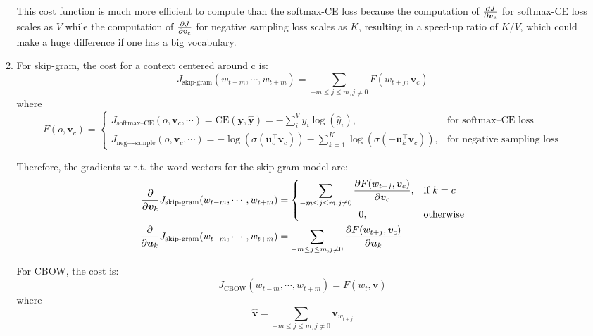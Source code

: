 \documentclass[10pt,reqno]{amsart}
\begin{document}
\begin{enumerate}[topsep=0pt,itemsep=3ex,partopsep=1ex,parsep=1ex]
\begin{enumerate}[itemsep=2ex]
    This cost function is much more efficient to compute than the softmax-CE loss 
    because the computation of $\frac{\partial J}{\partial \bm{v}_c}$ for softmax-CE loss scales as $V$
    while the computation of $\frac{\partial J}{\partial \bm{v}_c}$ for negative sampling loss scales as $K$, 
    resulting in a speed-up ratio of $K/V$,
    which could make a huge difference if one has a big vocabulary.

  \item
    For skip-gram, the cost for a context centered around c is:
    \begin{equation*}
      J_\text{skip-gram}(w_{t-m},\cdots,w_{t+m})
      = \sum_{-m \leq j \leq m, j \neq 0} F(w_{t+j}, \bm{v}_c)
    \end{equation*}
    where
    \begin{equation*}
      F(o, \bm{v}_c) = 
      \begin{cases}
        J_\text{softmax--CE}(o, \bm{v}_c, \cdots) = \text{CE}(\bm{y}, \bm{\hat{y}}) = - \displaystyle\sum_i^V y_i \log(\hat{y}_i), & \text{for softmax--CE loss} \\
        J_\text{neg−-sample}(o, \bm{v}_c, \cdots) = -\log(\sigma(\bm{u}_o^\top \bm{v}_c)) - \displaystyle\sum_{k=1}^K \log(\sigma(-\bm{u}_k^\top \bm{v}_c)), & \text{for negative sampling loss}
      \end{cases}
    \end{equation*}

    Therefore, the gradients w.r.t. the word vectors for the skip-gram model are:
    \begin{align*}
      \frac{\partial}{\partial \bm{v}_k} J_\text{skip-gram}(w_{t-m},\cdots,w_{t+m}) &= 
      \begin{cases}
        \displaystyle\sum_{-m \leq j \leq m, j \neq 0} \frac{\partial F(w_{t+j}, \bm{v}_c)}{\partial \bm{v}_c}, & \text{if}\ k = c \\
        \qquad\qquad\qquad 0, & \text{otherwise}
      \end{cases}\\
      \frac{\partial}{\partial \bm{u}_k} J_\text{skip-gram}(w_{t-m},\cdots,w_{t+m}) 
      &= \sum_{-m \leq j \leq m, j \neq 0} \frac{\partial F(w_{t+j}, \bm{v}_c)}{\partial \bm{u}_k} 
    \end{align*}

    For CBOW, the cost is:
    \begin{equation*}
      J_\text{CBOW}(w_{t-m},\cdots,w_{t+m}) = F(w_t, \bm{\hat{v}})
    \end{equation*}
    where
    \begin{equation*}
      \bm{\hat{v}} = \sum_{-m \leq j \leq m, j \neq 0} \bm{v}_{w_{t+j}}
    \end{equation*}


\end{enumerate}
\end{enumerate}
\end{document}
